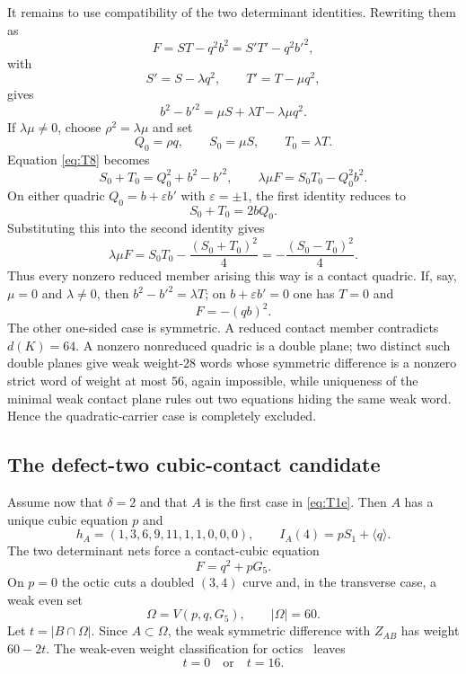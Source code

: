 \documentclass[11pt,reqno]{amsart}
\theoremstyle{remark}
\begin{document}
It remains to use compatibility of the two determinant identities.  Rewriting them as
\[
F=ST-q^2b^2=S'T'-q^2b'^2,
\]
with
\[
S'=S-\lambda q^2,
\qquad
T'=T-\mu q^2,
\]
gives
\[
b^2-b'^2=\mu S+\lambda T-\lambda\mu q^2. \tag{T8}\label{eq:T8}
\]
If $\lambda\mu\ne0$, choose $\rho^2=\lambda\mu$ and set
\[
Q_0=\rho q,
\qquad S_0=\mu S,
\qquad T_0=\lambda T.
\]
Equation \eqref{eq:T8} becomes
\[
S_0+T_0=Q_0^2+b^2-b'^2,
\qquad
\lambda\mu F=S_0T_0-Q_0^2b^2.
\]
On either quadric $Q_0=b+\varepsilon b'$ with $\varepsilon=\pm1$, the first identity reduces to
\[
S_0+T_0=2bQ_0.
\]
Substituting this into the second identity gives
\[
\lambda\mu F
=S_0T_0-\frac{(S_0+T_0)^2}{4}
=-\frac{(S_0-T_0)^2}{4}.
\]
Thus every nonzero reduced member arising this way is a contact quadric.  If, say, $\mu=0$ and $\lambda\ne0$, then $b^2-b'^2=\lambda T$; on $b+\varepsilon b'=0$ one has $T=0$ and
\[
F=-(qb)^2.
\]
The other one-sided case is symmetric.  A reduced contact member contradicts $d(K)=64$.  A nonzero nonreduced quadric is a double plane; two distinct such double planes give weak weight-$28$ words whose symmetric difference is a nonzero strict word of weight at most $56$, again impossible, while uniqueness of the minimal weak contact plane rules out two equations hiding the same weak word.  Hence the quadratic-carrier case is completely excluded.

\subsection{The defect-two cubic-contact candidate}
Assume now that $\delta=2$ and that $A$ is the first case in \eqref{eq:T1e}.  Then $A$ has a unique cubic equation $p$ and
\[
h_A=(1,3,6,9,11,1,1,0,0,0),
\qquad
I_A(4)=pS_1+\langle q\rangle.
\]
The two determinant nets force a contact-cubic equation
\[
F=q^2+pG_5.
\]
On $p=0$ the octic cuts a doubled $(3,4)$ curve and, in the transverse case, a weak even set
\[
\Omega=V(p,q,G_5),
\qquad |\Omega|=60.
\]
Let $t=|B\cap\Omega|$.  Since $A\subset\Omega$, the weak symmetric difference with $Z_{AB}$ has weight $60-2t$.  The weak-even weight classification for octics~\cite{EndrassMinimal} leaves
\[
t=0\quad\text{or}\quad t=16. \tag{T9}\label{eq:T9}
\]
\end{document}

